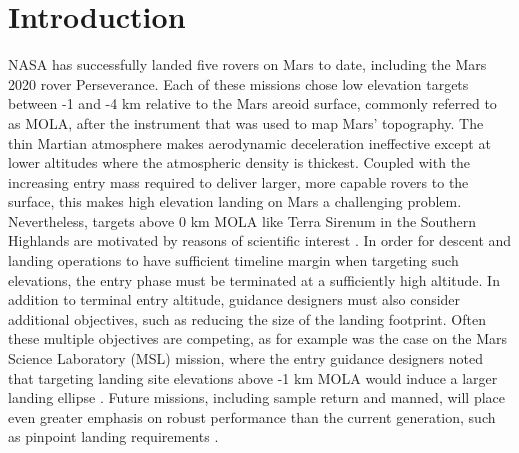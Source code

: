 \documentclass[journal ]{new-aiaa}
\begin{document}
\section*{Introduction}


\lettrine{N}{ASA} has successfully landed five rovers on Mars to date, including the Mars 2020 rover Perseverance. Each of these missions chose low elevation targets between -1 and -4 km relative to the Mars areoid surface, commonly referred to as MOLA, after the instrument that was used to map Mars' topography. The thin Martian atmosphere makes aerodynamic deceleration ineffective except at lower altitudes where the atmospheric density is thickest. Coupled with the increasing entry mass required to deliver larger, more capable rovers to the surface, this makes high elevation landing on Mars a challenging problem. Nevertheless, targets above 0 km MOLA like Terra Sirenum in the Southern Highlands are motivated by reasons of scientific interest \cite{MarsWater}. In order for descent and landing operations to have sufficient timeline margin \cite{BraunMarsEDL,MSL_EDL2} when targeting such elevations, the entry phase must be terminated at a sufficiently high altitude.
In addition to terminal entry altitude, guidance designers must also consider additional objectives, such as reducing the size of the landing footprint. Often these multiple objectives are competing, as for example was the case on the Mars Science Laboratory (MSL) mission, where the entry guidance designers noted that targeting landing site elevations above -1 km MOLA would induce a larger landing ellipse \cite{MSL_EDL2}. 
Future missions, including sample return \cite{MSR} and manned, will place even greater emphasis on robust performance than the current generation, such as pinpoint landing requirements \cite{EvolvableMars}. 
\end{document}
